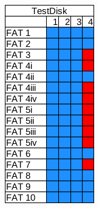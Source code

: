 \begin{figure}
\begin{subfigure}{0.16\linewidth}
    \end{subfigure}
    \begin{subfigure}{0.16\linewidth}
        \includegraphics[width=\linewidth]{fig/testdisk_results_fat.png}

\end{subfigure}
\end{figure}

